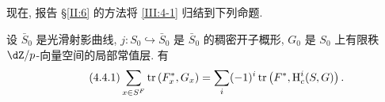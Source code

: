 \subsection{}\label{III:4-4}

现在, 报告 \S\ref{II:6} 的方法将 \ref{III:4-1} 归结到下列命题.

\begingroup
\renewcommand{\thesubsection}{4.1bis}
\renewcommand{\theHsubsection}{\theHsection.1bis}
\begin{theorem_}\label{III:4-1bis}
设 $\bar S_0$ 是光滑射影曲线, $j:S_0\hookrightarrow \bar S_0$ 是 $\bar S_0$ 的稠密开子概形, $G_0$ 是 $S_0$ 上有限秩 $\dZ/p$-向量空间的局部常值层. 有
\begin{equation*}\tag{4.4.1}\label{III:eq:4-4-1}
  \sum_{x\in S^F} \operatorname{tr}\left(F_x^*,G_x\right) = \sum_i (-1)^i \operatorname{tr}\left(F^*,\operatorname{H}_c^i(S,G)\right) \text{.}
\end{equation*}
\end{theorem_}
\endgroup
\addtocounter{subsection}{-1}
